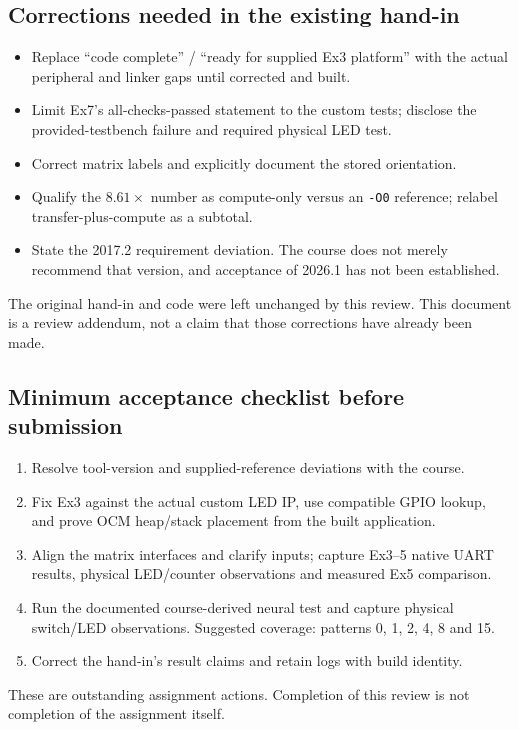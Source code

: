 \documentclass[11pt,a4paper]{article}
\begin{document}
\subsection*{Corrections needed in the existing hand-in}
\begin{itemize}
\item Replace ``code complete'' / ``ready for supplied Ex3 platform'' with the
actual peripheral and linker gaps until corrected and built.
\item Limit Ex7's all-checks-passed statement to the custom tests; disclose the
provided-testbench failure and required physical LED test.
\item Correct matrix labels and explicitly document the stored orientation.
\item Qualify the $8.61\times$ number as compute-only versus an
\texttt{-O0} reference; relabel transfer-plus-compute as a subtotal.
\item State the 2017.2 requirement deviation. The course does not merely
recommend that version, and acceptance of 2026.1 has not been established.
\end{itemize}
The original hand-in and code were left unchanged by this review. This document
is a review addendum, not a claim that those corrections have already been made.

\subsection*{Minimum acceptance checklist before submission}
\begin{enumerate}
\item Resolve tool-version and supplied-reference deviations with the course.
\item Fix Ex3 against the actual custom LED IP, use compatible GPIO lookup,
and prove OCM heap/stack placement from the built application.
\item Align the matrix interfaces and clarify inputs; capture Ex3--5 native
UART results, physical LED/counter observations and measured Ex5 comparison.
\item Run the documented course-derived neural test and capture physical
switch/LED observations. Suggested coverage: patterns 0, 1, 2, 4, 8 and 15.
\item Correct the hand-in's result claims and retain logs with build identity.
\end{enumerate}
These are outstanding assignment actions. Completion of this review is not
completion of the assignment itself.
\end{document}
